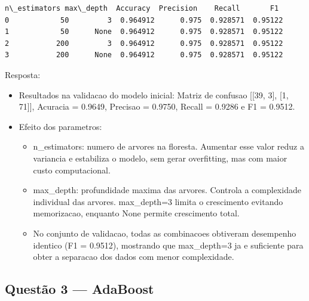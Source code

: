 \documentclass[11pt]{article}
\makeatletter
\providecommand{\tightlist}{%
      \setlength{\itemsep}{0pt}\setlength{\parskip}{0pt}}
\newcommand{\boxspacing}{\kern\kvtcb@left@rule\kern\kvtcb@boxsep}
\newcommand{\prompt}[4]{
        {\ttfamily\llap{{\color{#2}[#3]:\hspace{3pt}#4}}\vspace{-\baselineskip}}
    }
\makeatother
\begin{document}
            \begin{tcolorbox}[breakable, size=fbox, boxrule=.5pt, pad at break*=1mm, opacityfill=0]
\prompt{Out}{outcolor}{2}{\boxspacing}
\begin{Verbatim}[commandchars=\\\{\}]
   n\_estimators max\_depth  Accuracy  Precision    Recall       F1
0            50         3  0.964912      0.975  0.928571  0.95122
1            50      None  0.964912      0.975  0.928571  0.95122
2           200         3  0.964912      0.975  0.928571  0.95122
3           200      None  0.964912      0.975  0.928571  0.95122
\end{Verbatim}
\end{tcolorbox}
        
    Resposta:

\begin{itemize}
\tightlist
\item
  Resultados na validacao do modelo inicial: Matriz de confusao
  {[}{[}39, 3{]}, {[}1, 71{]}{]}, Acuracia = 0.9649, Precisao = 0.9750,
  Recall = 0.9286 e F1 = 0.9512.
\item
  Efeito dos parametros:

  \begin{itemize}
  \tightlist
  \item
    n\_estimators: numero de arvores na floresta. Aumentar esse valor
    reduz a variancia e estabiliza o modelo, sem gerar overfitting, mas
    com maior custo computacional.
  \item
    max\_depth: profundidade maxima das arvores. Controla a complexidade
    individual das arvores. max\_depth=3 limita o crescimento evitando
    memorizacao, enquanto None permite crescimento total.
  \item
    No conjunto de validacao, todas as combinacoes obtiveram desempenho
    identico (F1 = 0.9512), mostrando que max\_depth=3 ja e suficiente
    para obter a separacao dos dados com menor complexidade.
  \end{itemize}
\end{itemize}

    \subsection{Questão 3 --- AdaBoost}\label{questuxe3o-3-adaboost}
\end{document}
